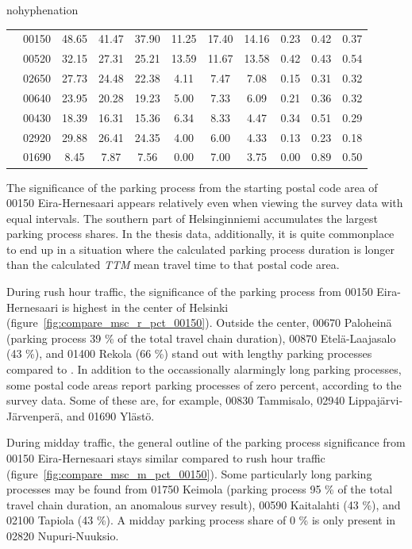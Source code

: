 \begin{hyphenrules}{nohyphenation}
\begin{table}[H]
{\begin{tabular}{>{\raggedleft\arraybackslash}p{4cm} lccCccCccc}
             & 00150 & 48.65 & 41.47 & 37.90 & 11.25 & 17.40 & 14.16 & 0.23 & 0.42 & 0.37 \\
            & 00520 &                       32.15 & 27.31 & 25.21 &     13.59 & 11.67 & 13.58 & 0.42 & 0.43 & 0.54 \\
            & 02650 &                       27.73 & 24.48 & 22.38 &     4.11 & 7.47 & 7.08 &    0.15 & 0.31 & 0.32 \\
            & 00640 &                       23.95 & 20.28 & 19.23 &     5.00 & 7.33 & 6.09 &    0.21 & 0.36 & 0.32 \\
            & 00430 &                       18.39 & 16.31 & 15.36 &     6.34 & 8.33 & 4.47 &    0.34 & 0.51 & 0.29 \\
            & 02920 &                       29.88 & 26.41 & 24.35 &     4.00 & 6.00 & 4.33 &    0.13 & 0.23 & 0.18 \\
            & 01690 &                       8.45 & 7.87 & 7.56 &        0.00 & 7.00 & 3.75 &    0.00 & 0.89 & 0.50 \\
            \bottomrule
        \end{tabular}}
    \end{table}
\end{hyphenrules}

The significance of the parking process from the starting postal code area of 00150 Eira-Hernesaari appears relatively even when viewing the survey data with equal intervals. The southern part of Helsinginniemi accumulates the largest parking process shares. In the thesis  data, additionally, it is quite commonplace to end up in a situation where the calculated parking process duration is longer than the calculated \textit{TTM} mean travel time to that postal code area.

During rush hour traffic, the significance of the parking process from 00150 Eira-Hernesaari is highest in the center of Helsinki (figure~\ref{fig:compare_msc_r_pct_00150}). Outside the center, 00670 Paloheinä (parking process 39 \% of the total travel chain duration), 00870 Etelä-Laajasalo (43 \%), and 01400 Rekola (66 \%) stand out with lengthy parking processes compared to . In addition to the occassionally alarmingly long parking processes, some postal code areas report parking processes of zero percent, according to the survey data. Some of these are, for example, 00830 Tammisalo, 02940 Lippajärvi-Järvenperä, and 01690 Ylästö.

During midday traffic, the general outline of the parking process significance from 00150 Eira-Hernesaari stays similar compared to rush hour traffic (figure~\ref{fig:compare_msc_m_pct_00150}). Some particularly long parking processes may be found from 01750 Keimola (parking process 95 \% of the total travel chain duration, an anomalous survey result), 00590 Kaitalahti (43 \%), and 02100 Tapiola (43 \%). A midday parking process share of 0 \% is only present in 02820 Nupuri-Nuuksio.

